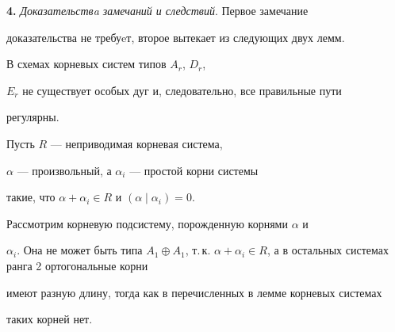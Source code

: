 {\bf 4.} {\it Доказательствa замечаний и следствий}. Первое замечание


доказательства не требуeт, второе вытекает из следующих двух лемм.





\begin{lem}


В схемах корневых систем типов $A_r$, $D_r$,


$E_r$ не существует особых дуг и, следовательно, все правильные пути


регулярны.


\end{lem}





\begin{pf}


Пусть $R$ --- неприводимая корневая система,


$\alpha $ --- произвольный, а $\alpha_i$ --- простой корни системы


такие, что $\alpha +\alpha_i\in R$ и $(\alpha \mid \alpha_i)=0$.


Рассмотрим корневую подсистему, порожденную корнями $\alpha $ и


$\alpha_i$. Она не может быть типа $A_1\oplus A_1$, т.\,к. $\alpha +


\alpha_i\in R$, а в остальных системах ранга 2 ортогональные корни


имеют разную длину, тогда как в перечисленных в лемме корневых системах


таких корней нет.


\end{pf}






